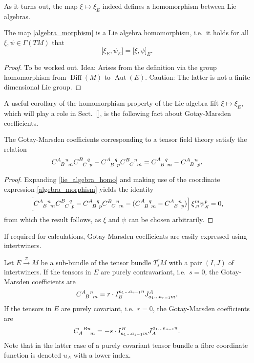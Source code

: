 As it turns out, the map $\xi\mapsto \xi_E$ indeed defines a homomorphism between Lie algebras.
\begin{proposition}
  The map \eqref{algebra_morphism} is a Lie algebra homomorphism, i.e.~it holds for all $\xi,\psi\in\Gamma(TM)$ that
  \begin{equation}\label{lie_algebra_homo}
    \lbrack \xi_E,\psi_E\rbrack = \lbrack \xi,\psi\rbrack_E.
  \end{equation}
\end{proposition}
\begin{proof}
  To be worked out. Idea: Arises from the definition via the group homomorphism from $\operatorname{Diff}(M)$ to $\operatorname{Aut}(E)$. Caution: The latter is not a finite dimensional Lie group.
\end{proof}
A useful corollary of the homomorphism property of the Lie algebra lift $\xi\mapsto\xi_E$, which will play a role in Sect.~\ref{}, is the following fact about Gotay-Marsden coefficients.
\begin{corollary}
  The Gotay-Marsden coefficients  corresponding to a tensor field theory satisfy the relation
  \begin{equation}
    \gmc{A}{B}{n}{m} \gmc{B}{C}{q}{p} - \gmc{A}{B}{q}{p} \gmc{B}{C}{n}{m} = \gmc{A}{B}{q}{m} - \gmc{A}{B}{n}{p}.
  \end{equation}
\end{corollary}
\begin{proof}
  Expanding \eqref{lie_algebra_homo} and making use of the coordinate expression \eqref{algebra_morphism} yields the identity
  \begin{equation}
    \left\lbrack\gmc{A}{B}{n}{m} \gmc{B}{C}{q}{p} - \gmc{A}{B}{q}{p} \gmc{B}{C}{n}{m} - (\gmc{A}{B}{q}{m} - \gmc{A}{B}{n}{p})\right\rbrack \xi^m_{,n} \psi^p_{,q} = 0,
  \end{equation}
  from which the result follows, as $\xi$ and $\psi$ can be chosen arbitrarily.
\end{proof}

If required for calculations, Gotay-Marsden coefficients are easily expressed using intertwiners.
\begin{proposition}\label{prop_gmc_intertwiner}
  Let $E\overset{\pi}{\longrightarrow} M$ be a sub-bundle of the tensor bundle $T^r_sM$ with a pair $(I,J)$ of intertwiners. If the tensors in $E$ are purely contravariant, i.e.~$s=0$, the Gotay-Marsden coefficients are
  \begin{equation}\label{gmc_contra}
    \gmc{A}{B}{n}{m} = r \cdot I^{a_1\dots a_{r-1}n}_B J^A_{a_1\dots a_{r-1}m}.
  \end{equation}
  If the tensors in $E$ are purely covariant, i.e.~$r=0$, the Gotay-Marsden coefficients are
  \begin{equation}
    \gmcd{A}{B}{n}{m} = -s \cdot I^B_{a_1\dots a_{s-1}m} J^{a_1\dots a_{s-1}n}_A.
  \end{equation}
  Note that in the latter case of a purely covariant tensor bundle a fibre coordinate function is denoted $u_A$ with a lower index.
\end{proposition}

